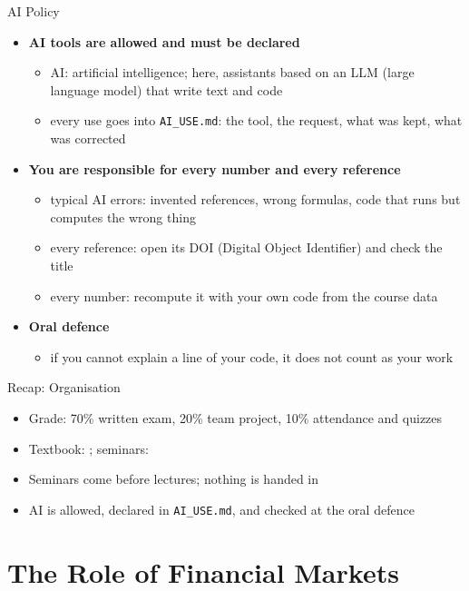 \begin{frame}{AI Policy}
\itemsize{\small}
\begin{itemize}
    \item \textbf{AI tools are allowed and must be declared}
    \begin{itemize}
        \item AI: artificial intelligence; here, assistants based on an LLM (large language model) that write text and code
        \item every use goes into \texttt{AI\_USE.md}: the tool, the request, what was kept, what was corrected
    \end{itemize}
    \item \textbf{You are responsible for every number and every reference}
    \begin{itemize}
        \item typical AI errors: invented references, wrong formulas, code that runs but computes the wrong thing
        \item every reference: open its DOI (Digital Object Identifier) and check the title
        \item every number: recompute it with your own code from the course data
    \end{itemize}
    \item \textbf{Oral defence}
    \begin{itemize}
        \item if you cannot explain a line of your code, it does not count as your work
    \end{itemize}
\end{itemize}
\end{frame}

\begin{frame}{Recap: Organisation}
\itemsize{\small}
\begin{itemize}
    \item Grade: 70\% written exam, 20\% team project, 10\% attendance and quizzes
    \item Textbook: ; seminars: 
    \item Seminars come before lectures; nothing is handed in
    \item AI is allowed, declared in \texttt{AI\_USE.md}, and checked at the oral defence
\end{itemize}
\end{frame}


\section{The Role of Financial Markets}

